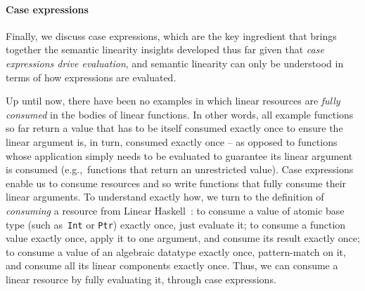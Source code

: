 \documentclass[acmsmall,review,anonymous,screen]{acmart}
\newcommand{\lolli}{\multimap}
\newcommand{\tensor}{\otimes}
\begin{document}
\paragraph{Case expressions}
Finally, we discuss case expressions,
which are the key ingredient that brings together the
semantic linearity insights developed thus far given that
\emph{case expressions drive evaluation}, and semantic linearity can only be
understood in terms of how expressions are evaluated.

Up until now, there
have been no examples in which linear resources are \emph{fully consumed} in
the bodies of linear functions. In other words, all example functions so far
return a value that has to be itself consumed exactly once to ensure the linear
argument is, in turn, consumed exactly once -- as opposed to functions whose
application simply needs to be evaluated to guarantee its linear argument is
consumed (e.g.,~functions that return an unrestricted value).
%
%
%
%
Case expressions enable us to consume resources and so write
functions that fully consume their linear arguments.
To understand exactly how,
we turn to the definition of \emph{consuming} a resource from Linear
Haskell~\cite{cite:linearhaskell}:
to consume a value of atomic base type (such as~\texttt{Int} or
        \texttt{Ptr}) exactly once, just evaluate it;
        to consume a function value exactly once, apply it to one argument,
        and consume its result exactly once;
        to consume a value of an algebraic datatype exactly once,
        pattern-match on it, and consume all its linear components exactly once.
Thus, we can consume a linear resource by fully evaluating it, through case
expressions.
\end{document}

